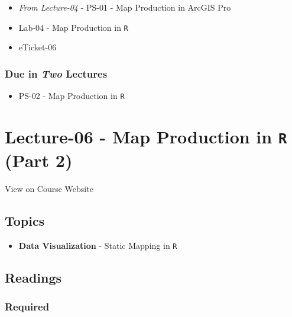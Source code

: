 \documentclass[]{book}
\providecommand{\tightlist}{%
  \setlength{\itemsep}{0pt}\setlength{\parskip}{0pt}}
\begin{document}
\begin{itemize}
\tightlist
\item
  \emph{From Lecture-04} - PS-01 - Map Production in ArcGIS Pro
\item
  Lab-04 - Map Production in \texttt{R}
\item
  eTicket-06
\end{itemize}

\hypertarget{due-in-two-lectures-1}{%
\subsubsection*{\texorpdfstring{Due in \emph{Two} Lectures}{Due in Two Lectures}}\label{due-in-two-lectures-1}}

\begin{itemize}
\tightlist
\item
  PS-02 - Map Production in \texttt{R}
\end{itemize}

\hypertarget{lecture-06---map-production-in-r-part-2}{%
\section*{\texorpdfstring{Lecture-06 - Map Production in \texttt{R} (Part 2)}{Lecture-06 - Map Production in R (Part 2)}}\label{lecture-06---map-production-in-r-part-2}}

View on Course Website

\hypertarget{topics-6}{%
\subsection*{Topics}\label{topics-6}}

\begin{itemize}
\tightlist
\item
  \textbf{Data Visualization} - Static Mapping in \texttt{R}
\end{itemize}

\hypertarget{readings-7}{%
\subsection*{Readings}\label{readings-7}}

\hypertarget{required-4}{%
\subsubsection*{Required}\label{required-4}}
\end{document}
